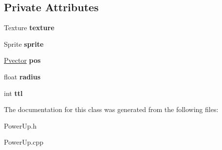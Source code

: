 \subsection*{Private Attributes}
\begin{DoxyCompactItemize}
\item 
Texture {\bfseries texture}\hypertarget{class_power_up_af2c8446e8f43818c234d3125b5008c7a}{}\label{class_power_up_af2c8446e8f43818c234d3125b5008c7a}

\item 
Sprite {\bfseries sprite}\hypertarget{class_power_up_af929833923dba8879e795fe4b4eac964}{}\label{class_power_up_af929833923dba8879e795fe4b4eac964}

\item 
\hyperlink{class_pvector}{Pvector} {\bfseries pos}\hypertarget{class_power_up_aaa295011bac6aa0e38e15aa3bb835776}{}\label{class_power_up_aaa295011bac6aa0e38e15aa3bb835776}

\item 
float {\bfseries radius}\hypertarget{class_power_up_a9049553a937beb78249ce204b7fe953e}{}\label{class_power_up_a9049553a937beb78249ce204b7fe953e}

\item 
int {\bfseries ttl}\hypertarget{class_power_up_ad3af44dba00bcaf23497cca0eb4248b1}{}\label{class_power_up_ad3af44dba00bcaf23497cca0eb4248b1}

\end{DoxyCompactItemize}


The documentation for this class was generated from the following files\+:\begin{DoxyCompactItemize}
\item 
Power\+Up.\+h\item 
Power\+Up.\+cpp\end{DoxyCompactItemize}
